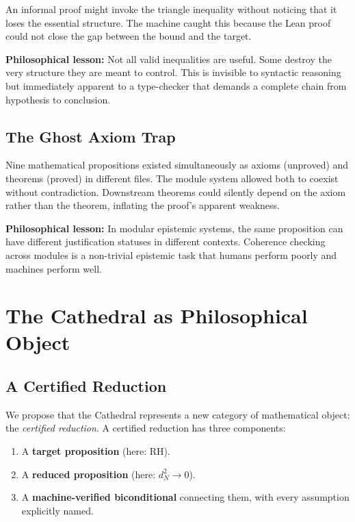 \documentclass[11pt,a4paper]{article}
\newcommand{\RH}{\ensuremath{\mathrm{RH}}}
\begin{document}
An informal proof might invoke the triangle inequality without
noticing that it loses the essential structure. The machine caught
this because the Lean proof could not close the gap between the
bound and the target.

\textbf{Philosophical lesson:} Not all valid inequalities are useful.
Some destroy the very structure they are meant to control. This is
invisible to syntactic reasoning but immediately apparent to a
type-checker that demands a complete chain from hypothesis to
conclusion.

\subsection{The Ghost Axiom Trap}

Nine mathematical propositions existed simultaneously as axioms
(unproved) and theorems (proved) in different files. The module
system allowed both to coexist without contradiction. Downstream
theorems could silently depend on the axiom rather than the theorem,
inflating the proof's apparent weakness.

\textbf{Philosophical lesson:} In modular epistemic systems, the same
proposition can have different justification statuses in different
contexts. Coherence checking across modules is a non-trivial epistemic
task that humans perform poorly and machines perform well.

\section{The Cathedral as Philosophical Object}
\label{sec:object}

\subsection{A Certified Reduction}

We propose that the Cathedral represents a new category of
mathematical object: the \emph{certified reduction}. A certified
reduction has three components:

\begin{enumerate}
  \item A \textbf{target proposition} (here: \RH).
  \item A \textbf{reduced proposition} (here: $d_N^2 \to 0$).
  \item A \textbf{machine-verified biconditional} connecting them,
    with every assumption explicitly named.
\end{enumerate}
\end{document}
